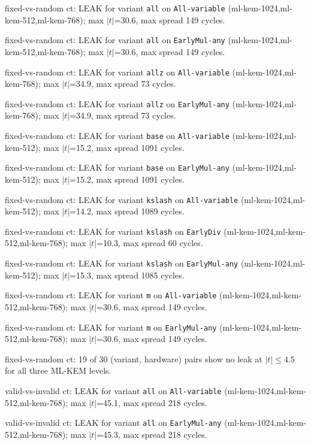 \item fixed-vs-random ct: LEAK for variant \texttt{all} on \texttt{All-variable} (ml-kem-1024,ml-kem-512,ml-kem-768); max $|t|$=30.6, max spread 149 cycles.
\item fixed-vs-random ct: LEAK for variant \texttt{all} on \texttt{EarlyMul-any} (ml-kem-1024,ml-kem-512,ml-kem-768); max $|t|$=30.6, max spread 149 cycles.
\item fixed-vs-random ct: LEAK for variant \texttt{allz} on \texttt{All-variable} (ml-kem-1024,ml-kem-768); max $|t|$=34.9, max spread 73 cycles.
\item fixed-vs-random ct: LEAK for variant \texttt{allz} on \texttt{EarlyMul-any} (ml-kem-1024,ml-kem-768); max $|t|$=34.9, max spread 73 cycles.
\item fixed-vs-random ct: LEAK for variant \texttt{base} on \texttt{All-variable} (ml-kem-1024,ml-kem-512); max $|t|$=15.2, max spread 1091 cycles.
\item fixed-vs-random ct: LEAK for variant \texttt{base} on \texttt{EarlyMul-any} (ml-kem-1024,ml-kem-512); max $|t|$=15.2, max spread 1091 cycles.
\item fixed-vs-random ct: LEAK for variant \texttt{kslash} on \texttt{All-variable} (ml-kem-1024,ml-kem-512); max $|t|$=14.2, max spread 1089 cycles.
\item fixed-vs-random ct: LEAK for variant \texttt{kslash} on \texttt{EarlyDiv} (ml-kem-1024,ml-kem-512,ml-kem-768); max $|t|$=10.3, max spread 60 cycles.
\item fixed-vs-random ct: LEAK for variant \texttt{kslash} on \texttt{EarlyMul-any} (ml-kem-1024,ml-kem-512); max $|t|$=15.3, max spread 1085 cycles.
\item fixed-vs-random ct: LEAK for variant \texttt{m} on \texttt{All-variable} (ml-kem-1024,ml-kem-512,ml-kem-768); max $|t|$=30.6, max spread 149 cycles.
\item fixed-vs-random ct: LEAK for variant \texttt{m} on \texttt{EarlyMul-any} (ml-kem-1024,ml-kem-512,ml-kem-768); max $|t|$=30.6, max spread 149 cycles.
\item fixed-vs-random ct: 19 of 30 (variant, hardware) pairs show no leak at $|t|\le4.5$ for all three ML-KEM levels.
\item valid-vs-invalid ct: LEAK for variant \texttt{all} on \texttt{All-variable} (ml-kem-1024,ml-kem-512,ml-kem-768); max $|t|$=45.1, max spread 218 cycles.
\item valid-vs-invalid ct: LEAK for variant \texttt{all} on \texttt{EarlyMul-any} (ml-kem-1024,ml-kem-512,ml-kem-768); max $|t|$=45.3, max spread 218 cycles.
